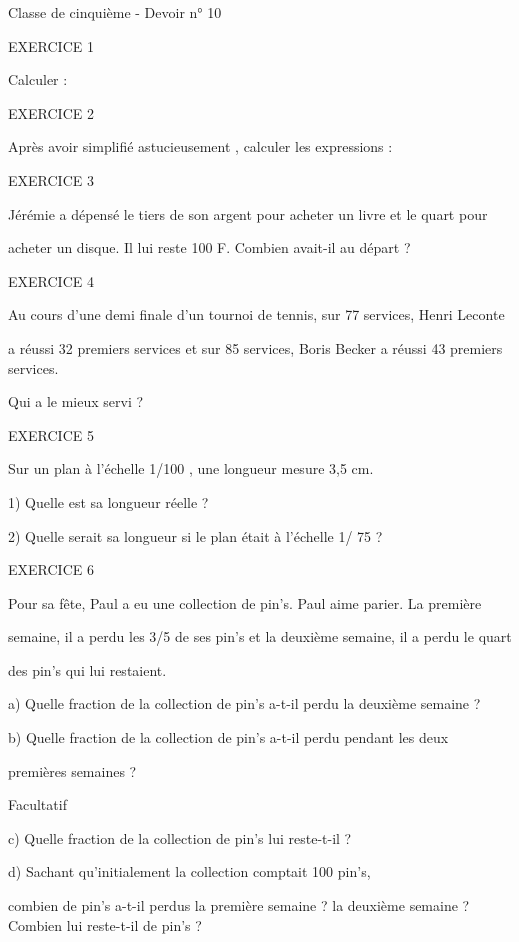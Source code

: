 \documentclass[11pt,a4paper]{article}
\begin{document}
Classe de cinquième - Devoir n° 10

EXERCICE 1

Calculer :

EXERCICE 2

Après avoir simplifié astucieusement , calculer les expressions :

EXERCICE 3

Jérémie a dépensé le tiers de son argent pour acheter un livre et le quart pour

acheter un disque. Il lui reste 100 F. Combien avait-il au départ ?

EXERCICE 4

Au cours d'une demi finale d'un tournoi de tennis, sur 77 services, Henri Leconte

a réussi 32 premiers services et sur 85 services, Boris Becker a réussi 43 premiers services.

Qui a le mieux servi ?

EXERCICE 5

Sur un plan à l'échelle 1/100 , une longueur mesure 3,5 cm.

1) Quelle est sa longueur réelle ?

2) Quelle serait sa longueur si le plan était à l'échelle 1/ 75 ?

EXERCICE 6

Pour sa fête, Paul a eu une collection de pin's. Paul aime parier. La première

semaine, il a perdu les 3/5 de ses pin's et la deuxième semaine, il a perdu le quart

des pin's qui lui restaient.

a) Quelle fraction de la collection de pin's a-t-il perdu la deuxième semaine ?

b) Quelle fraction de la collection de pin's a-t-il perdu pendant les deux

premières semaines ?

Facultatif

c) Quelle fraction de la collection de pin's lui reste-t-il ?

d) Sachant qu'initialement la collection comptait 100 pin's,

combien de pin's a-t-il perdus la première semaine ? la deuxième semaine ? Combien lui reste-t-il de pin's ?
\end{document}
